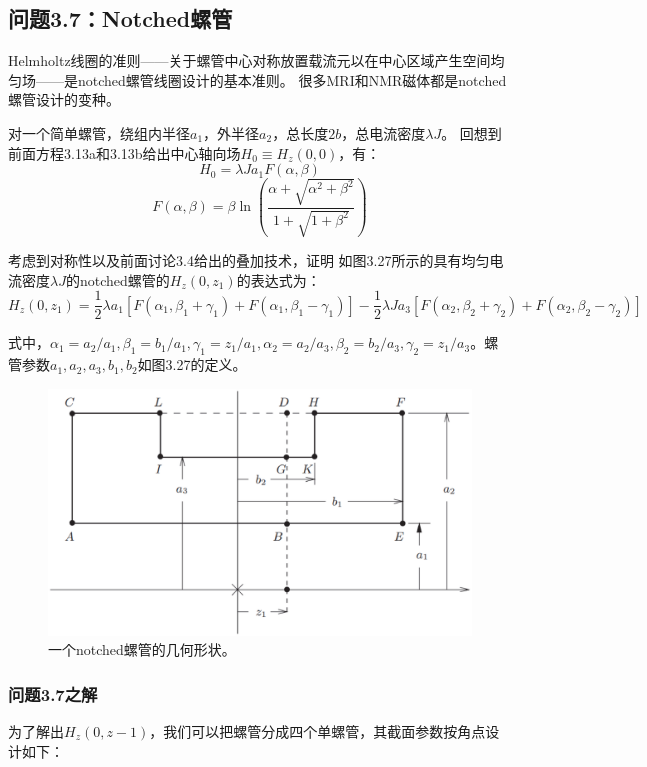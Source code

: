 \subsection{问题3.7：Notched螺管}
Helmholtz线圈的准则——关于螺管中心对称放置载流元以在中心区域产生空间均匀场——是notched螺管线圈设计的基本准则。
很多MRI和NMR磁体都是notched螺管设计的变种。

对一个简单螺管，绕组内半径$a_1$，外半径$a_2$，总长度$2b$，总电流密度$\lambda J$。
回想到前面方程3.13a和3.13b给出中心轴向场$H_0\equiv H_z(0, 0)$，有：
 \begin{equation}%
H_0=\lambda Ja_1F(\alpha,\beta)
\end{equation}
\begin{equation}%
F(\alpha,\beta)=\beta\ln(\frac{\alpha+\sqrt{\alpha^2+\beta^2}}{1+\sqrt{1+\beta^2}})
\end{equation}

考虑到对称性以及前面讨论3.4给出的叠加技术，证明
如图3.27所示的具有均匀电流密度$\lambda J$的notched螺管的$H_z(0, z_1)$的表达式为：
\begin{equation}%
H_z(0,z_1)=\frac{1}{2}\lambda a_1[F(\alpha_1,\beta_1+\gamma_1)+F(\alpha_1,\beta_1-\gamma_1)]-\frac{1}{2}\lambda Ja_3
[F(\alpha_2,\beta_2+\gamma_2)+F(\alpha_2,\beta_2-\gamma_2)]
\end{equation}

式中，$\alpha_1=a_2/a_1,\beta_1=b_1/a_1,\gamma_1=z_1/a_1,\alpha_2=a_2/a_3,\beta_2=b_2/a_3,\gamma_2=z_1/a_3$。螺管参数$a_1, a_2, a_3, b_1, b_2$如图3.27的定义。
\begin{figure}[htbp]
	\centering
	\includegraphics[scale=0.4]{chpt3/figs/fig3.27.eps}
	\caption{一个notched螺管的几何形状。}
\end{figure}


\subsubsection{问题3.7之解}
为了解出$H_z(0,z-1)$，我们可以把螺管分成四个单螺管，其截面参数按角点设计如下：

